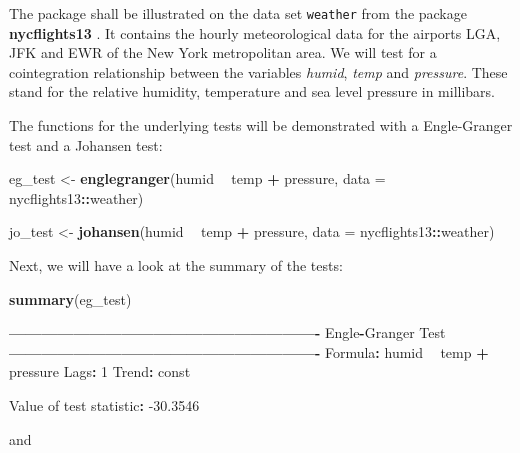 \documentclass[11pt,a4paper]{article}
\newenvironment{Shaded}{\begin{snugshade}}{\end{snugshade}}
\newcommand{\DataTypeTok}[1]{\textcolor[rgb]{0.13,0.29,0.53}{#1}}
\newcommand{\DecValTok}[1]{\textcolor[rgb]{0.00,0.00,0.81}{#1}}
\newcommand{\FloatTok}[1]{\textcolor[rgb]{0.00,0.00,0.81}{#1}}
\newcommand{\KeywordTok}[1]{\textcolor[rgb]{0.13,0.29,0.53}{\textbf{#1}}}
\newcommand{\NormalTok}[1]{#1}
\newcommand{\OperatorTok}[1]{\textcolor[rgb]{0.81,0.36,0.00}{\textbf{#1}}}
\newcommand{\StringTok}[1]{\textcolor[rgb]{0.31,0.60,0.02}{#1}}
\begin{document}
The package shall be illustrated on the data set \texttt{weather} from
the package \textbf{nycflights13} \autocite{wickham_nycflights13_2020}.
It contains the hourly meteorological data for the airports LGA, JFK and
EWR of the New York metropolitan area. We will test for a cointegration
relationship between the variables \emph{humid}, \emph{temp} and
\emph{pressure}. These stand for the relative humidity, temperature and
sea level pressure in millibars.

The functions for the underlying tests will be demonstrated with a
Engle-Granger test and a Johansen test:

\begin{Shaded}
\begin{Highlighting}[]
\NormalTok{eg_test <-}\StringTok{ }\KeywordTok{englegranger}\NormalTok{(humid }\OperatorTok{~}\StringTok{ }\NormalTok{temp }\OperatorTok{+}\StringTok{ }\NormalTok{pressure,}
                        \DataTypeTok{data =}\NormalTok{ nycflights13}\OperatorTok{::}\NormalTok{weather)}

\NormalTok{jo_test <-}\StringTok{ }\KeywordTok{johansen}\NormalTok{(humid }\OperatorTok{~}\StringTok{ }\NormalTok{temp }\OperatorTok{+}\StringTok{ }\NormalTok{pressure, }
                    \DataTypeTok{data =}\NormalTok{ nycflights13}\OperatorTok{::}\NormalTok{weather)}
\end{Highlighting}
\end{Shaded}

Next, we will have a look at the summary of the tests:

\begin{Shaded}
\begin{Highlighting}[]
\KeywordTok{summary}\NormalTok{(eg_test)}

\OperatorTok{----------------------------------------------------------}
\NormalTok{Engle}\OperatorTok{-}\NormalTok{Granger Test}
\OperatorTok{----------------------------------------------------------}
\NormalTok{Formula}\OperatorTok{:}\StringTok{ }\NormalTok{humid }\OperatorTok{~}\StringTok{ }\NormalTok{temp }\OperatorTok{+}\StringTok{ }\NormalTok{pressure}
\NormalTok{Lags}\OperatorTok{:}\StringTok{ }\DecValTok{1}
\NormalTok{Trend}\OperatorTok{:}\StringTok{ }\NormalTok{const}
 
\NormalTok{Value of test statistic}\OperatorTok{:}\StringTok{ }\FloatTok{-30.3546}
\end{Highlighting}
\end{Shaded}

and
\end{document}
